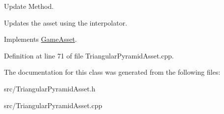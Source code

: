 Update Method. 

Updates the asset using the interpolator. 

Implements \hyperlink{classGameAsset}{Game\-Asset}.



Definition at line 71 of file Triangular\-Pyramid\-Asset.\-cpp.



The documentation for this class was generated from the following files\-:\begin{DoxyCompactItemize}
\item 
src/Triangular\-Pyramid\-Asset.\-h\item 
src/Triangular\-Pyramid\-Asset.\-cpp\end{DoxyCompactItemize}
